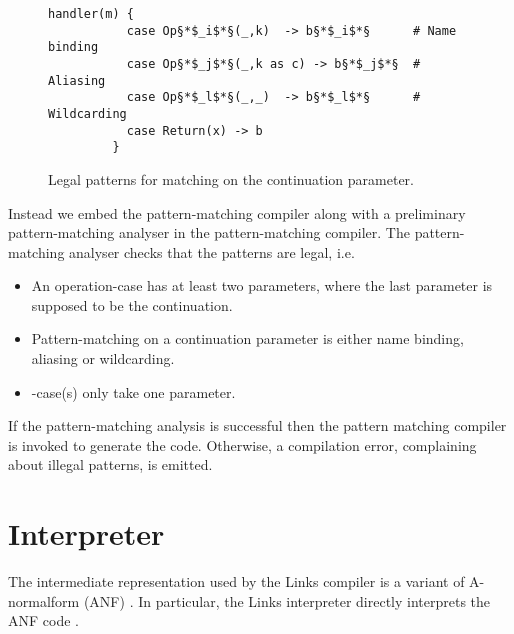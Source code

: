 \begin{figure}[H]
\begin{center}
\begin{lstlisting}[style=links]
         handler(m) {
           case Op§*$_i$*§(_,k)  -> b§*$_i$*§      # Name binding
           case Op§*$_j$*§(_,k as c) -> b§*$_j$*§  # Aliasing
           case Op§*$_l$*§(_,_)  -> b§*$_l$*§      # Wildcarding
           case Return(x) -> b
         }
\end{lstlisting}        
\end{center}
\caption{Legal patterns for matching on the continuation parameter.}\label{fig:cont-pattern-matching}
\end{figure}

Instead we embed the  pattern-matching compiler along with a preliminary pattern-matching analyser in the  pattern-matching compiler. The pattern-matching analyser checks that the patterns are legal, i.e.
\begin{itemize}
  \item An operation-case has at least two parameters, where the last parameter is supposed to be the continuation.
  \item Pattern-matching on a continuation parameter is either name binding, aliasing or wildcarding.
  \item {}-case(s) only take one parameter.
\end{itemize}
If the pattern-matching analysis is successful then the  pattern matching compiler is invoked to generate the code. Otherwise, a compilation error, complaining about illegal patterns, is emitted.

\section{Interpreter}
The intermediate representation used by the Links compiler is a variant of A-normalform (ANF) \cite{Flanagan1993}. In particular, the Links interpreter directly interprets the ANF code \cite{Lindley2012}.